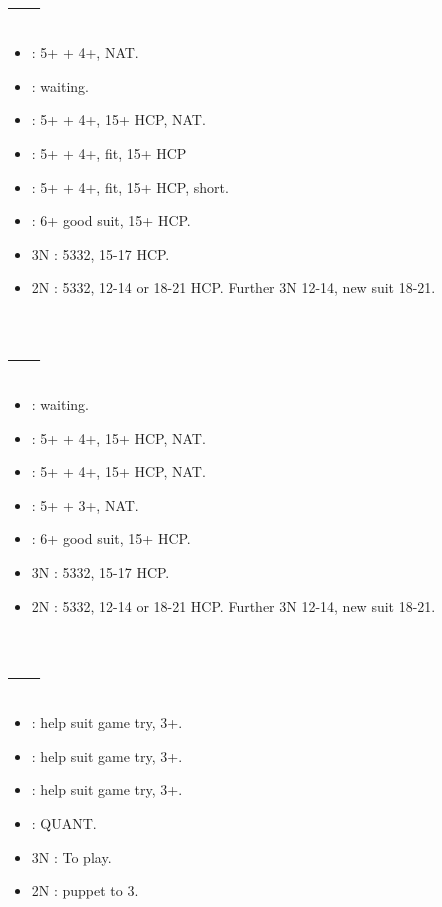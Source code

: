 \documentclass[12pt,twoside,a5paper]{report}%
\begin{document}
	\section*{----}
	\begin{itemize}
	\renewcommand{\labelitemi}{}
	\item {} : 5+\sp{} + 4+\he{}, NAT.
	\item {} : waiting.
	\item {} : 5+\he{} + 4+\cl{}, 15+ HCP, NAT.
	\item {} : 5+\sp{} + 4+\di{}, fit, 15+ HCP
	\item {} : 5+\sp{} + 4+\di{}, fit, 15+ HCP, short\he{}.
	\item {} : 6+\sp{} good suit, 15+ HCP.
	\item 3N : 5332, 15-17 HCP.
	\item 2N : 5332, 12-14 or 18-21 HCP. Further 3N 12-14, new suit 18-21.
	\end{itemize}

	\section*{----}
	\begin{itemize}
	\renewcommand{\labelitemi}{}
	\item {} : waiting.
	\item {} : 5+\he{} + 4+\cl{}, 15+ HCP, NAT.
	\item {} : 5+\sp{} + 4+\di{}, 15+ HCP, NAT.
	\item {} : 5+\sp{} + 3+\he{}, NAT.
	\item {} : 6+\sp{} good suit, 15+ HCP.
	\item 3N : 5332, 15-17 HCP.
	\item 2N : 5332, 12-14 or 18-21 HCP. Further 3N 12-14, new suit 18-21.
	\end{itemize}

	\section*{----}
	\begin{itemize}
	\renewcommand{\labelitemi}{} 
	\item {} : help suit game try, 3+\cl{}.
	\item {} : help suit game try, 3+\di{}.
	\item {} : help suit game try, 3+\he{}.
	\item {} : QUANT.
	\item 3N : To play.
	\item 2N : puppet to 3\cl{}.
	\end{itemize}
\end{document}
